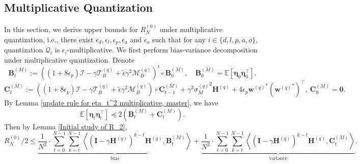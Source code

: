 \documentclass[11pt, letterpaper]{article}
\begin{document}
\subsection{Multiplicative Quantization}
In this section, we derive upper bounds for $R_N^{(0)}$ under multiplicative quantization, i.e., there exist $\epsilon_d,\epsilon_l,\epsilon_p,\epsilon_a$ and $\epsilon_o$ such that for any $i\in \{d,l,p,a,o\}$, quantization $\mathcal{Q}_i$ is $\epsilon_i$-multiplicative.
We first perform bias-variance decomposition under multiplicative quantization. 
Denote 
\begin{equation*}
    \mathbf{B}_t^{(M)}:=((1+8\epsilon_p)\mathcal{I}-\gamma\mathcal{T}_B^{(q)}+\tilde{\epsilon}\gamma^2\mathcal{M}_B^{(q)})^t \circ \mathbf{B}_0^{(M)}, \quad \mathbf{B}_0^{(M)}=\mathbb{E}\left[\boldsymbol{\eta}_0 \boldsymbol{\eta}_0^\top\right].
\end{equation*}
\begin{equation*}
    \mathbf{C}_t^{(M)} := ((1+8\epsilon_p)\mathcal{I}-\gamma \mathcal{T}_B^{(q)}+\tilde{\epsilon}\gamma^2\mathcal{M}_B^{(q)})\circ\mathbf{C}_{t-1}^{(M)}+\gamma^2 {\sigma_M^{(q)}}^2\mathbf{H}^{(q)}+4\epsilon_p{\mathbf{w}^{(q)}}^*({\mathbf{w}^{(q)}}^*)^\top,\ \mathbf{C}_0^{(M)}=\boldsymbol{0}.
\end{equation*}
By Lemma \ref{update rule for eta_t^2 multiplicative, master}, we have 
\begin{equation*}
    \mathbb{E}\left[\boldsymbol{\eta}_t\boldsymbol{\eta}_t^\top\right]\preceq2\left(\mathbf{B}_t^{(M)}+\mathbf{C}_t^{(M)}\right).
\end{equation*}
Then by Lemma \ref{Initial study of R_2},
\begin{equation}
    \label{eq: f mul}
    R_N^{(0)}/2\leq \underbrace{\frac{1}{N^2}\cdot\sum_{t=0}^{N-1}\sum_{k=t}^{N-1}\left\langle(\mathbf{I}-\gamma\mathbf{H}^{(q)})^{k-t}\mathbf{H}^{(q)},\mathbf{B}_t^{(M)}\right\rangle}_{\mathrm{bias}}+\underbrace{\frac{1}{N^2}\cdot\sum_{t=0}^{N-1}\sum_{k=t}^{N-1}\left\langle(\mathbf{I}-\gamma\mathbf{H}^{(q)})^{k-t}\mathbf{H}^{(q)},\mathbf{C}_t^{(M)}\right\rangle}_{\mathrm{variance}}.
\end{equation}
\end{document}
